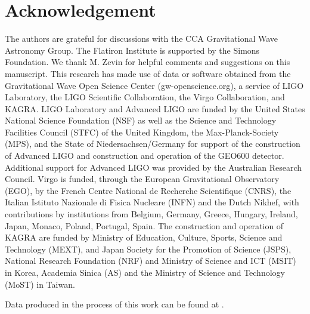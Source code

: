 \documentclass[twocolumn]{aastex631}
\begin{document}
\section{Acknowledgement}
The authors are grateful for discussions with the CCA Gravitational Wave Astronomy Group.
The Flatiron Institute is supported by the Simons Foundation.  We thank M. Zevin for helpful comments and suggestions on this manuscript.
This research has made use of data or software obtained from the Gravitational Wave Open Science Center (gw-openscience.org),
a service of LIGO Laboratory, the LIGO Scientific Collaboration, the Virgo Collaboration, and KAGRA.
LIGO Laboratory and Advanced LIGO are funded by the United States National Science Foundation (NSF) as well as
the Science and Technology Facilities Council (STFC) of the United Kingdom, the Max-Planck-Society (MPS),
and the State of Niedersachsen/Germany for support of the construction of Advanced LIGO and construction and operation of the GEO600 detector.
Additional support for Advanced LIGO was provided by the Australian Research Council. Virgo is funded, through the European Gravitational Observatory (EGO),
by the French Centre National de Recherche Scientifique (CNRS), the Italian Istituto Nazionale di Fisica Nucleare (INFN) and the Dutch Nikhef,
with contributions by institutions from Belgium, Germany, Greece, Hungary, Ireland, Japan, Monaco, Poland, Portugal, Spain.
The construction and operation of KAGRA are funded by Ministry of Education, Culture, Sports, Science and Technology (MEXT),
and Japan Society for the Promotion of Science (JSPS), National Research Foundation (NRF) and Ministry of Science and ICT (MSIT) in Korea,
Academia Sinica (AS) and the Ministry of Science and Technology (MoST) in Taiwan.

Data produced in the process of this work can be found at \cite{wong2022-data}.



\end{document}
